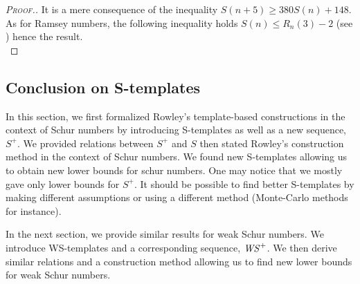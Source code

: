 \begin{proof}[\textsc{Proof.}]
It is a mere consequence of the inequality \( S(n+5) \geqslant 380S(n) + 148\). As for Ramsey
numbers, the following inequality holds \(S(n) \leqslant R_n(3) - 2\) (see \cite{AbbottHanson}) hence the result. \\
\end{proof}


\subsection{Conclusion on S-templates}

\qquad In this section, we first formalized Rowley's template-based constructions \cite{RowleyRamsey} in the context of Schur numbers 
by introducing S-templates as well as a new sequence, \(S^+\). We provided relations between \(S^+\) and \(S\) then 
stated Rowley's construction method in the context of Schur numbers. We found new S-templates allowing us to obtain 
new lower bounds for schur numbers. One may notice that we mostly gave only lower bounds for \(S^+\). It should be possible to 
find better S-templates by making different assumptions or using a different method (Monte-Carlo methods for instance).

\par
In the next section, we provide similar results for weak Schur numbers. We introduce WS-templates and a corresponding sequence, 
\(\mathit{WS}^+\). We then derive similar relations and a construction method allowing us to find new lower bounds for weak Schur numbers.